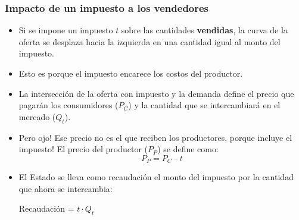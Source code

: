 \documentclass{beamer}
\begin{document}
\begin{frame}
\frametitle{Impacto de un impuesto a los vendedores}
\begin{itemize}
    \item Si se impone un impuesto $t$ sobre las cantidades \textbf{vendidas}, la curva de la oferta se desplaza hacia la izquierda en una cantidad igual al monto del impuesto.
    \item Esto es porque el impuesto encarece los costos del productor. 
    \item La intersección de la oferta con impuesto y la demanda define el precio que pagarán los consumidores ($P_C$) y la cantidad que se intercambiará en el mercado ($Q_t$).
    \item Pero ojo! Ese precio no es el que reciben los productores, porque incluye el impuesto! El precio del productor ($P_P$) se define como:
      \[ P_P=P_C\ – \ t\] 
    \item El Estado se lleva como recaudación el monto del impuesto por la cantidad que ahora se intercambia: \\
    \begin{center}
          Recaudación = $t \cdot Q_t $ 
    \end{center}

\end{itemize}
\end{frame}



\end{document}
